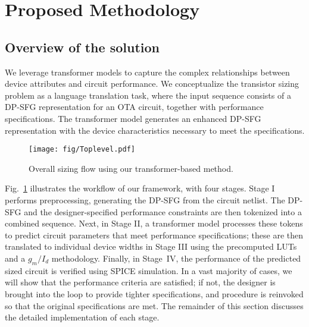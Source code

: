 \section{Proposed Methodology}
\label{sec:sizing_framework}

\subsection{Overview of the solution}

\noindent
We leverage transformer models to capture the complex relationships between device attributes and circuit performance. We conceptualize the transistor sizing problem as a language translation task, where the input sequence consists of a DP-SFG representation for an OTA circuit, together with performance specifications. The transformer model generates an enhanced DP-SFG representation with the device characteristics necessary to meet the specifications.

\begin{figure}[b]
  \vspace{-5mm}
  \centering
  \texttt{[image: fig/Toplevel.pdf]} %
  \caption{Overall sizing flow using our transformer-based method.}
  \label{fig:toplevel}
\end{figure}

Fig.~\ref{fig:toplevel} illustrates the workflow of our framework, with four stages. Stage I performs preprocessing, generating the DP-SFG from the circuit netlist.  The DP-SFG and the designer-specified performance constraints are then tokenized into a combined sequence. Next, in Stage II, a transformer model processes these tokens to predict circuit parameters that meet performance specifications; these are then translated to individual device widths in Stage III using the precomputed LUTs and a $g_m/I_d$ methodology. Finally, in Stage~IV, the performance of the predicted sized circuit is verified using SPICE simulation. In a vast majority of cases, we will show that the performance criteria are satisfied; if not, the designer is brought into the loop to provide tighter specifications, and procedure is reinvoked so that the original specifications are met. The remainder of this section discusses the detailed implementation of each stage.

% 
\vspace{-2mm}
